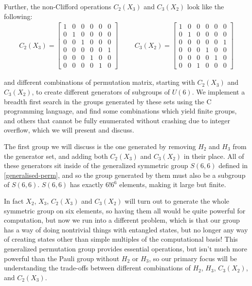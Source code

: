 Further, the non-Clifford operations $C_2(X_3)$ and $C_3(X_2)$ look like the following:
\begin{align*}
C_2(X_3) = \begin{bmatrix}
1 & 0 & 0 & 0 & 0 & 0 \\
0 & 1 & 0 & 0 & 0 & 0 \\
0 & 0 & 1 & 0 & 0 & 0 \\
0 & 0 & 0 & 0 & 0 & 1 \\
0 & 0 & 0 & 1 & 0 & 0 \\
0 & 0 & 0 & 0 & 1 & 0
\end{bmatrix}
&&&
C_3(X_2) = \begin{bmatrix}
1 & 0 & 0 & 0 & 0 & 0 \\
0 & 1 & 0 & 0 & 0 & 0 \\
0 & 0 & 0 & 0 & 0 & 1 \\
0 & 0 & 0 & 1 & 0 & 0 \\
0 & 0 & 0 & 0 & 1 & 0 \\
0 & 0 & 1 & 0 & 0 & 0
\end{bmatrix}
\end{align*}

and different combinations of permutation matrix, starting with $C_2(X_3)$ and $C_3(X_2)$, to create different generators of subgroups of $U(6)$. We implement a breadth first search in the groups generated by these sets using the C programming language, and find some combinations which yield finite groups, and others that cannot be fully enumerated without crashing due to integer overflow, which we will present and discuss.

The first group we will discuss is the one generated by removing $H_2$ and $H_3$ from the generator set, and adding both $C_2(X_3)$ and $C_3(X_2)$ in their place. All of these generators sit inside of the generalized symmetric group $S(6,6)$ defined in \autoref{generalised-perm}, and so the group generated by them must also be a subgroup of $S(6,6)$. $S(6, 6)$ has exactly $6!6^6$ elements, making it large but finite.

In fact $X_2$, $X_3$, $C_2(X_3)$ and $C_3(X_2)$ will turn out to generate the whole symmetric group on six elements, so having them all would be quite powerful for computation, but now we run into a different problem, which is that our group has a way of doing nontrivial things with entangled states, but no longer any way of creating states other than simple multiples of the computational basis! This generalized permutation group provides essential operations, but isn't much more powerful than the Pauli group without $H_2$ or $H_3$, so our primary focus will be understanding the trade-offs between different combinations of $H_2$, $H_3$, $C_3(X_2)$, and $C_2(X_3)$.
